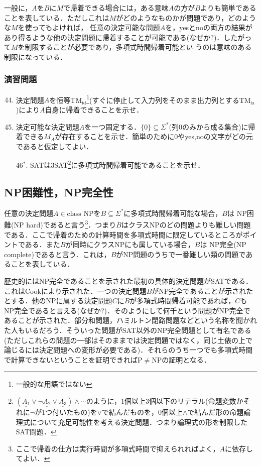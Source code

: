 \documentclass{ltjsarticle}
\theoremstyle{mystyle1}
\theoremstyle{mystyle3}
\theoremstyle{mystyle2}
\newcommand{\red}[1]{{\color{red} #1}}
\begin{document}
一般に，$A$を$B$に$M$で帰着できる場合には，ある意味$A$の方が$B$よりも簡単であることを表している．ただしこれは$M$がどのようなものかが問題であり，どのような$M$を使ってもよければ， 任意の決定可能な問題$A$を，yesとnoの両方の結果があり得るような他の決定問題に帰着することが可能である(なぜか?)．したがって$M$を制限することが必要であり，多項式時間帰着可能とい うのは意味のある制限になっている．
\subsubsection*{演習問題}
\begin{enumerate}
  \setcounter{enumi}{43}
  \item 決定問題$A$を恒等TM$_\text{id}$\footnote{一般的な用語ではない}(すぐに停止して入力列をそのまま出力列とするTM$_\text{ia}$)により$A$自身に帰着できることを示せ．
  \item 決定可能な決定問題$A$を一つ固定する．$\{0\}\subseteq\Sigma^\ast$(列0のみから成る集合)に帰着できる$M_A$が存在することを示せ．簡単のために0やyes,noの文字がどの元であると仮定してよい．
  \item[46$^\ast$.] SATは3SAT\footnote{$\left(\underline{A_1}\vee\neg\underline{A_2}\vee\underline{A_3}\right)\wedge\cdots$のように，1個以上3個以下のリテラル(命題変数かそれに$\neg$が1つ付いたもの)を$\vee$で結んだものを，0個以上$\wedge$で結んだ形の命題論理式について充足可能性を考える決定問題．つまり論理式の形を制限したSAT問題．}に多項式時間帰着可能であることを示せ．
\end{enumerate}
\subsection{NP困難性，NP完全性}\label{sec:NP}
任意の決定問題$A\in\text{class NP}$を$B\subseteq\Sigma^\ast$に多項式時間帰着可能な場合，$B$は\red{NP困難}(NP hard)であると言う\footnote{ここで帰着の仕方は実行時間が多項式時間で抑えられればよく，$A$に依存してよい．}．つまり$B$はクラスNPのどの問題よりも難しい問題である．ここで帰着のための計算時間を多項式時間に限定しているところがポイントである．また$B$が同時にクラスNPにも属している場合，$B$は\red{NP完全}(NP complete)であると言う．これは，$B$がNP問題のうちで一番難しい類の問題であることを表している．

歴史的にはNP完全であることを示された最初の具体的決定問題がSATである．これはCookにより示された．一つの決定問題$B$がNP完全であることが示されたとする．他のNPに属する決定問題$C$に$B$が多項式時間帰着可能であれば，$C$もNP完全であると言える(なぜか?)．そのようにして何千という問題がNP完全であることが示された．部分和問題，ハミルトン閉路問題などという名称を聞かれた人もいるだろう．そういった問題がSAT以外のNP完全問題として有名である(ただしこれらの問題の一部はそのままでは決定問題ではなく，同じ土俵の上で論じるには決定問題への変形が必要である)．それらのうち一つでも多項式時間で計算できないということを証明できればP$\neq$NPの証明となる．
\end{document}
